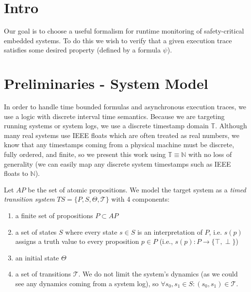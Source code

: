 \documentclass[10pt,a4paper]{article}
\begin{document}
\section{Intro}
Our goal is to choose a useful formalism for runtime monitoring of safety-critical embedded systems. To do this we wish to verify that a given execution trace satisfies some desired property (defined by a formula $\psi$). 

\section{Preliminaries - System Model}
In order to handle time bounded formulas and asynchronous execution traces, we use a logic with discrete interval time semantics. Because we are targeting running systems or system logs, we use a discrete timestamp domain $\mathbb{T}$. Although many real systems use IEEE floats which are often treated as real numbers, we know that any timestamps coming from a physical machine must be discrete, fully ordered, and finite, so we present this work using $\mathbb{T} \equiv \mathbb{N}$ with no loss of generality (we can easily map any discrete system timestamps such as IEEE floats to $\mathbb{N}$).

Let $AP$ be the set of atomic propositions.
%
We model the target system as a \emph{timed transition system} $TS = \{ P, S, \Theta, \mathcal{T}\}$ with 4 components:
\begin{enumerate}
\item a finite set of propositions $P \subset AP$
\item a set of states $S$ where every state $s \in S$ is an interpretation of $P$, i.e. $s(p)$ assigns a truth value to every proposition $p \in P$  (i.e., $s(p): P \rightarrow \{\top, \perp\}$)
\item an initial state $\Theta$
\item a set of transitions $\mathcal{T}$. We do not limit the system's dynamics (as we could see any dynamics coming from a system log), so $\forall s_0,s_1 \in S: (s_0,s_1) \in \mathcal{T}$.
\end{enumerate}
\end{document}
